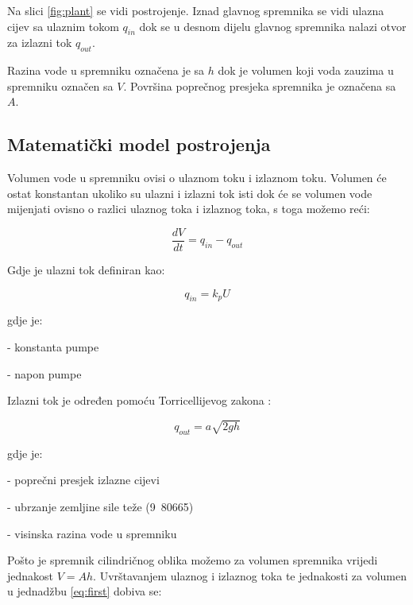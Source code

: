 Na slici \ref{fig:plant} se vidi postrojenje. Iznad glavnog spremnika se vidi
ulazna cijev sa ulaznim tokom $q_{in}$ dok se u desnom dijelu glavnog spremnika
nalazi otvor za izlazni tok $q_{out}$.

Razina vode u spremniku označena je sa $h$ dok je volumen koji voda zauzima u
spremniku označen sa $V$. Površina poprečnog presjeka spremnika je označena sa
$A$.

\newpage
\subsection{Matematički model postrojenja}


Volumen vode u spremniku ovisi o ulaznom toku i izlaznom toku. Volumen će ostat
konstantan ukoliko su ulazni i izlazni tok isti dok će se volumen vode mijenjati
ovisno o razlici ulaznog toka i izlaznog toka, s toga možemo reći:

\begin{equation}
    \frac{dV}{dt} = q_{in} - q_{out}
\label{eq:first}
\end{equation}

Gdje je ulazni tok definiran kao:

\begin{equation} q_{in} = k_p U \end{equation}

gdje je:
\begin{description}[labelindent=2cm]
        \item[$k_p$] - konstanta pumpe
        \item[$U$]   - napon pumpe
\end{description}

Izlazni tok je određen pomoću Torricellijevog zakona \cite[75]{fluid}:

\begin{equation} q_{out} = a \sqrt{2gh} \end{equation}

gdje je:
\begin{description}[labelindent=2cm]
        \item[$a$] - poprečni presjek izlazne cijevi
        \item[$g$] - ubrzanje zemljine sile teže
            (\unit{9.80665}{\metre\per\square\second})
        \item[$h$] - visinska razina vode u spremniku
\end{description}

Pošto je spremnik cilindričnog oblika možemo za volumen spremnika vrijedi
jednakost $V = A h$. Uvrštavanjem ulaznog i izlaznog toka te jednakosti za
volumen u jednadžbu \ref{eq:first} dobiva se:

